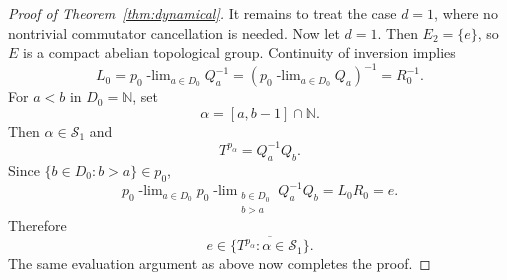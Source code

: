 \documentclass[10pt,a4paper]{amsart}
\newcommand{\N}{\mathbb N}
\newcommand{\ulim}[2]{#1\!\operatorname{-lim}_{#2}}
\begin{document}
\begin{proof}[Proof of Theorem~\ref{thm:dynamical}]
 
It remains to treat the case $d=1$, where no nontrivial commutator
cancellation is needed.
Now let $d=1$.  Then $E_2=\{e\}$, so $E$ is a compact abelian topological
group.  Continuity of inversion implies
\[
 L_0=\ulim{  p_0}{a\in D_0}Q_a^{-1}
 =\left(\ulim{  p_0}{a\in D_0}Q_a\right)^{-1}=R_0^{-1}.
\]
For $a<b$ in $D_0=\N$, set
\[
 \alpha=[a,b-1]\cap\N.
\]
Then $\alpha\in\mathcal S_1$ and
\[
 T^{p_\alpha}=Q_a^{-1}Q_b.
\]
Since $\{b\in D_0:b>a\}\in p_0$,
\[
 \ulim{ p_0}{a\in D_0}
 \ulim{  p_0}{\substack{b\in D_0\\b>a}}Q_a^{-1}Q_b
  =L_0R_0 =e.
\]
Therefore
\[
 e\in
 \overline{\{T^{p_\alpha}:\alpha\in\mathcal S_1\}}.
\]
 The same evaluation argument as above now completes the proof.
\end{proof}
\end{document}
